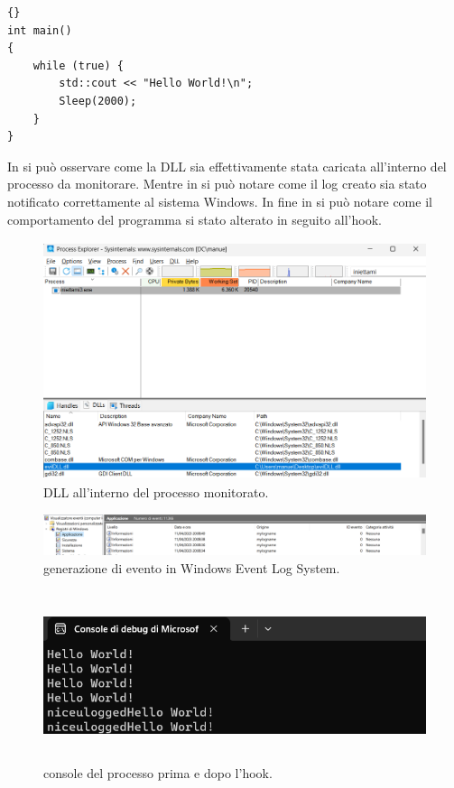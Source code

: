 \begin{lstlisting}[float=hbt,caption={semplice programma console su cui eseguire il test (iniettami3.exe).},captionpos=b,frame=single,basicstyle=\tiny]{}
int main()
{
    while (true) {
        std::cout << "Hello World!\n";
        Sleep(2000);
    }
}
\end{lstlisting}

In  si può osservare come la DLL sia effettivamente stata caricata all'interno del processo da monitorare.
Mentre in   si può notare come il log creato sia stato notificato correttamente al sistema Windows.
In fine in  si può notare come il comportamento del programma si stato alterato in seguito all'hook.

\begin{figure}[hbtp]
    \centering
    \includegraphics[width=\textwidth,height=7cm]{res/fig/hook-dll.png}
    \caption{DLL all'interno del processo monitorato.}
    \label{fig:hook1}
\end{figure}

\begin{figure}[hbtp]
    \centering
    \includegraphics[width=\textwidth]{res/fig/hook-evento.png}
    \caption{generazione di evento in Windows Event Log System.}
    \label{fig:hook2}
\end{figure}
\begin{figure}[hbtp]
    \centering
    \includegraphics[width=\textwidth,height=5cm]{res/fig/hook-console.png}
    \caption{console del processo prima e dopo l'hook.}
    \label{fig:hook3}
\end{figure}


